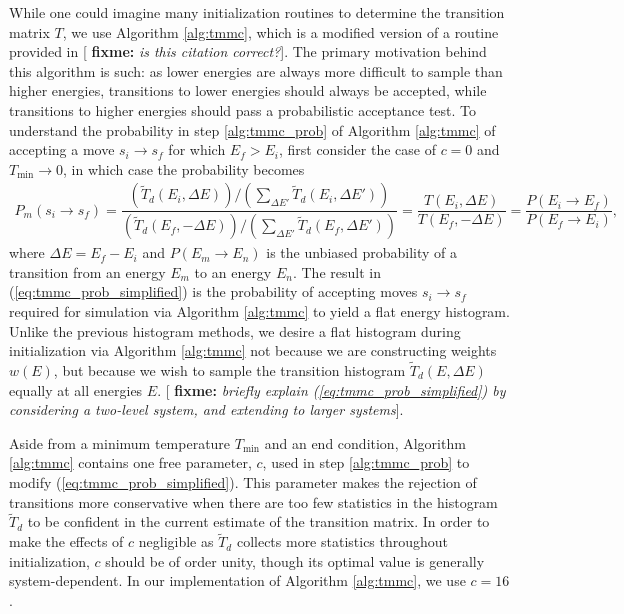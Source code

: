 \documentclass[11pt]{article}
\renewcommand{\t}{\text} %
\newcommand{\f}[2]{\dfrac{#1}{#2}} %
\newcommand{\p}[1]{\left(#1\right)} %
\newcommand{\red}[1]{{\bf \color{red} #1}}
\newcommand{\fixme}[1]{[\red{fixme:} \emph{#1}]}
\begin{document}
While one could imagine many initialization routines to determine the
transition matrix $T$, we use Algorithm \ref{alg:tmmc}, which is a
modified version of a routine provided in \cite{tmmc_prl}\fixme{is
  this citation correct?}. The primary motivation behind this
algorithm is such: as lower energies are always more difficult to
sample than higher energies, transitions to lower energies should
always be accepted, while transitions to higher energies should pass a
probabilistic acceptance test. To understand the probability in step
\ref{alg:tmmc_prob} of Algorithm \ref{alg:tmmc} of accepting a move
$s_i\to s_f$ for which $E_f>E_i$, first consider the case of $c=0$ and
$T_{\t{min}}\to0$, in which case the probability becomes
\begin{align}
  P_m\p{s_i\to s_f}=\f{\p{\tilde T_d\p{E_i,\Delta E}}\big/
    \p{\sum_{\Delta E'}\tilde T_d\p{E_i,\Delta E'}}}
  {\p{\tilde T_d\p{E_f,-\Delta E}}\big/
    \p{\sum_{\Delta E'}\tilde T_d\p{E_f,\Delta E'}}}
  =\f{T\p{E_i,\Delta E}}{T\p{E_f,-\Delta E}}
  =\f{P\p{E_i\to E_f}}{P\p{E_f\to E_i}},
  \label{eq:tmmc_prob_simplified}
\end{align}
where $\Delta E=E_f-E_i$ and $P\p{E_m\to E_n}$ is the unbiased
probability of a transition from an energy $E_m$ to an energy
$E_n$. The result in (\ref{eq:tmmc_prob_simplified}) is the
probability of accepting moves $s_i\to s_f$ required for simulation
via Algorithm \ref{alg:tmmc} to yield a flat energy
histogram\cite{tmmc}. Unlike the previous histogram methods, we desire
a flat histogram during initialization via Algorithm \ref{alg:tmmc}
not because we are constructing weights $w\p{E}$, but because we wish
to sample the transition histogram $\tilde T_d\p{E,\Delta E}$ equally
at all energies $E$. \fixme{briefly explain
  (\ref{eq:tmmc_prob_simplified}) by considering a two-level system,
  and extending to larger systems}.

Aside from a minimum temperature $T_{\t{min}}$ and an end condition,
Algorithm \ref{alg:tmmc} contains one free parameter, $c$, used in
step \ref{alg:tmmc_prob} to modify (\ref{eq:tmmc_prob_simplified}).
This parameter makes the rejection of transitions more conservative
when there are too few statistics in the histogram $\tilde T_d$ to be
confident in the current estimate of the transition matrix. In order
to make the effects of $c$ negligible as $\tilde T_d$ collects more
statistics throughout initialization, $c$ should be of order unity,
though its optimal value is generally system-dependent. In our
implementation of Algorithm \ref{alg:tmmc}, we use $c=16$.
\end{document}
